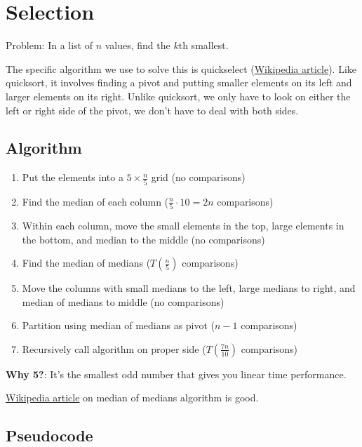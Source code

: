 \section{Selection}

Problem: In a list of $n$ values, find the $k$th smallest.

The specific algorithm we use to solve this is quickselect (\hyperlink{https://en.wikipedia.org/wiki/Quickselect}{Wikipedia article}). Like quicksort, it involves finding a pivot and putting smaller elements on its left and larger elements on its right. Unlike quicksort, we only have to look on either the left or right side of the pivot, we don't have to deal with both sides.

\subsection*{Algorithm}\label{subsec:Selection-Algorithm}

\begin{enumerate}
    \item Put the elements into a $5 \times \frac n 5$ grid (no comparisons)
    \item Find the median of each column ($\frac n 5 \cdot 10 = 2n$ comparisons)
    \item Within each column, move the small elements in the top, large elements in the bottom, and median to the middle (no comparisons)
    \item Find the median of medians ($T(\frac n 5)$ comparisons)
    \item Move the columns with small medians to the left, large medians to right, and median of medians to middle (no comparisons)
    \item Partition using median of medians as pivot ($n-1$ comparisons)
    \item Recursively call algorithm on proper side ($T(\frac{7n}{10})$ comparisons)
\end{enumerate}

\textbf{Why 5?}: It's the smallest odd number that gives you linear time performance.

\hyperlink{https://en.wikipedia.org/wiki/Median_of_medians}{Wikipedia article} on median of medians algorithm is good.

\subsection*{Pseudocode}

